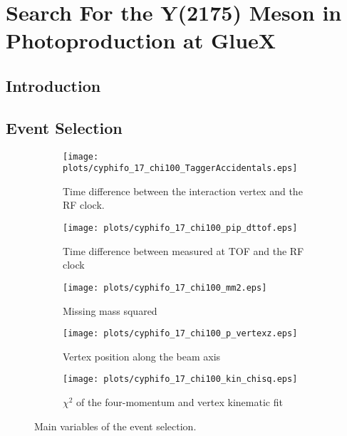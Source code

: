 \section{Search For the Y(2175) Meson in Photoproduction at GlueX}
\label{p4}

\subsection{Introduction}

\subsection{Event Selection}

\begin{figure}[H]
    \centering
    \begin{subfigure}[b]{0.45\textwidth}
        \texttt{[image: plots/cyphifo\_17\_chi100\_TaggerAccidentals.eps]}
        \caption{Time difference between the interaction vertex and the RF clock.}
        \label{fig.4.1.a}
    \end{subfigure}\hfill
    \begin{subfigure}[b]{0.45\textwidth}
        \texttt{[image: plots/cyphifo\_17\_chi100\_pip\_dttof.eps]}
        \caption{Time difference between measured at TOF and the RF clock}
        \label{fig.4.1.b}
    \end{subfigure}\hfill
    \begin{subfigure}[b]{0.45\textwidth}
        \texttt{[image: plots/cyphifo\_17\_chi100\_mm2.eps]}
        \caption{Missing mass squared}
        \label{fig.4.1.c}
    \end{subfigure}\hfill
    \begin{subfigure}[b]{0.45\textwidth}
        \texttt{[image: plots/cyphifo\_17\_chi100\_p\_vertexz.eps]}
        \caption{Vertex position along the beam axis}
        \label{fig.4.1.d}
    \end{subfigure}\hfill
    \begin{subfigure}[b]{0.45\textwidth}
        \texttt{[image: plots/cyphifo\_17\_chi100\_kin\_chisq.eps]}
        \caption{$\chi^{2}$ of the four-momentum and vertex kinematic fit}
        \label{fig.4.1.e}
    \end{subfigure}
    \caption{Main variables of the event selection.}
    \label{fig:4.1}
\end{figure}

